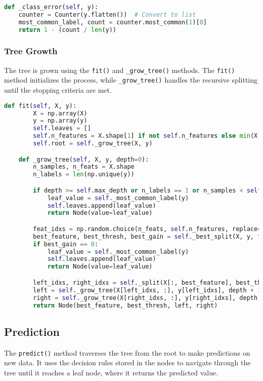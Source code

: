 \documentclass{article}
\begin{document}
\begin{lstlisting}[language=Python, caption=misclassification error]
def _class_error(self, y):
    counter = Counter(y.flatten())  # Convert to list
    most_common_label, count = counter.most_common(1)[0]
    return 1 - (count / len(y))
\end{lstlisting}

\subsubsection{Tree Growth}
The tree is grown using the \texttt{fit()} and \texttt{\_grow\_tree()} methods. The \texttt{fit()} method initializes the process, while \texttt{\_grow\_tree()} handles the recursive splitting until the stopping criteria are met.

\begin{lstlisting}[language=Python, caption=Tree Growth Process]
    def fit(self, X, y):
        X = np.array(X)
        y = np.array(y)     
        self.leaves = []
        self.n_features = X.shape[1] if not self.n_features else min(X.shape[1], self.n_features)
        self.root = self._grow_tree(X, y)

    def _grow_tree(self, X, y, depth=0):
        n_samples, n_feats = X.shape
        n_labels = len(np.unique(y))

        if depth >= self.max_depth or n_labels == 1 or n_samples < self.min_samples_split:
            leaf_value = self._most_common_label(y)
            self.leaves.append(leaf_value)
            return Node(value=leaf_value)

        feat_idxs = np.random.choice(n_feats, self.n_features, replace=False)
        best_feature, best_thresh, best_gain = self._best_split(X, y, feat_idxs)
        if best_gain == 0:
            leaf_value = self._most_common_label(y)
            self.leaves.append(leaf_value)
            return Node(value=leaf_value)

        left_idxs, right_idxs = self._split(X[:, best_feature], best_thresh)
        left = self._grow_tree(X[left_idxs, :], y[left_idxs], depth + 1)
        right = self._grow_tree(X[right_idxs, :], y[right_idxs], depth + 1)
        return Node(best_feature, best_thresh, left, right)

\end{lstlisting}

\subsection{Prediction}
The \texttt{predict()} method traverses the tree from the root to make predictions on new data. It uses the decision rules stored in the nodes to navigate through the tree until it reaches a leaf node, where it returns the predicted value.
\end{document}
